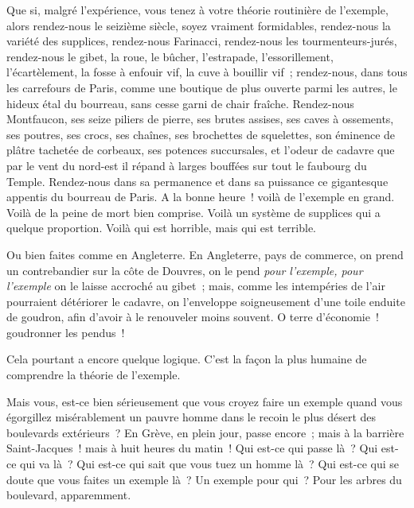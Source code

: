 \documentclass[french,twoside]{book} %
\begin{document}
Que si, malgré l’expérience, vous tenez à votre théorie routinière de l’exemple, alors rendez-nous le seizième siècle, soyez vraiment formidables, rendez-nous la variété des supplices, rendez-nous Farinacci, rendez-nous les tourmenteurs-jurés, rendez-nous le gibet, la roue, le bûcher, l’estrapade, l’essorillement, l’écartèlement, la fosse à enfouir vif, la cuve à bouillir vif ; rendez-nous, dans tous les carrefours de Paris, comme une boutique de plus ouverte parmi les autres, le hideux étal du bourreau, sans cesse garni de chair fraîche. Rendez-nous Montfaucon, ses seize piliers de pierre, ses brutes assises, ses caves à ossements, ses poutres, ses crocs, ses chaînes, ses brochettes de squelettes, son éminence de plâtre tachetée de corbeaux, ses potences succursales, et l’odeur de cadavre que par le vent du nord-est il répand à larges bouffées sur tout le faubourg du Temple. Rendez-nous dans sa permanence et dans sa puissance ce gigantesque appentis du bourreau de Paris. A la bonne  heure ! voilà de l’exemple en grand. Voilà de la peine de mort bien comprise. Voilà un système de supplices qui a quelque proportion. Voilà qui est horrible, mais qui est terrible.\par
Ou bien faites comme en Angleterre. En Angleterre, pays de commerce, on prend un contrebandier sur la côte de Douvres, on le pend \emph{pour l’exemple, pour l’exemple} on le laisse accroché au gibet ; mais, comme les intempéries de l’air pourraient détériorer le cadavre, on l’enveloppe soigneusement d’une toile enduite de goudron, afin d’avoir à le renouveler moins souvent. O terre d’économie ! goudronner les pendus !\par
Cela pourtant a encore quelque logique. C’est la façon la plus humaine de comprendre la théorie de l’exemple.\par
Mais vous, est-ce bien sérieusement que vous croyez faire un exemple quand vous égorgillez misérablement un pauvre homme dans le recoin le plus désert des boulevards extérieurs ? En Grève, en plein jour, passe encore ; mais à la barrière Saint-Jacques ! mais à huit heures du matin ! Qui est-ce qui passe là ? Qui est-ce qui va là ? Qui est-ce qui sait que vous tuez un homme là ? Qui est-ce qui se doute que vous faites un exemple là ? Un exemple pour qui ? Pour les arbres du boulevard, apparemment.\par
\end{document}
